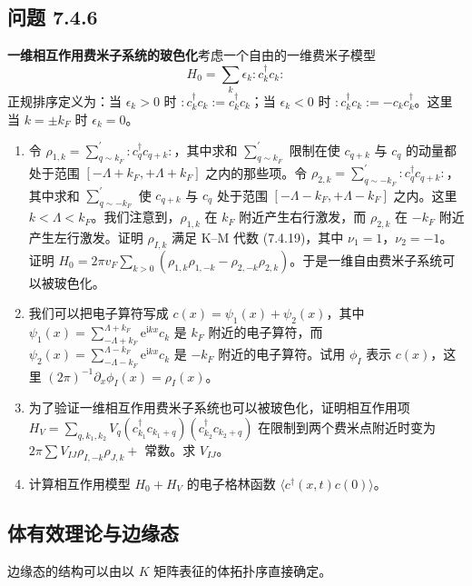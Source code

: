 \subsection*{问题 7.4.6}

\textbf{一维相互作用费米子系统的玻色化}考虑一个自由的一维费米子模型
\begin{equation*}
H_0=\sum_k\epsilon_k:c_k^\dagger c_k:
\end{equation*}
正规排序定义为：当 $\epsilon_k>0$ 时 $:c_k^\dagger c_k:=c_k^\dagger c_k$；当 $\epsilon_k<0$ 时 $:c_k^\dagger c_k:=-c_kc_k^\dagger$。这里当 $k=\pm k_F$ 时 $\epsilon_k=0$。
\begin{enumerate}
\item 令 $\rho_{1,k}=\sum_{q\sim k_F}^{\prime}:c_q^\dagger c_{q+k}:$，其中求和 $\sum_{q\sim k_F}^{\prime}$ 限制在使 $c_{q+k}$ 与 $c_q$ 的动量都处于范围 $[-\Lambda+k_F,+\Lambda+k_F]$ 之内的那些项。令 $\rho_{2,k}=\sum_{q\sim-k_F}^{\prime}:c_q^\dagger c_{q+k}:$，其中求和 $\sum_{q\sim-k_F}^{\prime}$ 使 $c_{q+k}$ 与 $c_q$ 处于范围 $[-\Lambda-k_F,+\Lambda-k_F]$ 之内。这里 $k<\Lambda<k_F$。我们注意到，$\rho_{1,k}$ 在 $k_F$ 附近产生右行激发，而 $\rho_{2,k}$ 在 $-k_F$ 附近产生左行激发。证明 $\rho_{I,k}$ 满足 K--M 代数 (7.4.19)，其中 $\nu_1=1$，$\nu_2=-1$。证明 $H_0=2\pi v_F\sum_{k>0}(\rho_{1,k}\rho_{1,-k}-\rho_{2,-k}\rho_{2,k})$。于是一维自由费米子系统可以被玻色化。
\item 我们可以把电子算符写成 $c(x)=\psi_1(x)+\psi_2(x)$，其中 $\psi_1(x)=\sum_{-\Lambda+k_F}^{\Lambda+k_F}\mathrm{e}^{\mathrm{i}kx}c_k$ 是 $k_F$ 附近的电子算符，而 $\psi_2(x)=\sum_{-\Lambda-k_F}^{\Lambda-k_F}\mathrm{e}^{\mathrm{i}kx}c_k$ 是 $-k_F$ 附近的电子算符。试用 $\phi_I$ 表示 $c(x)$，这里 $(2\pi)^{-1}\partial_x\phi_I(x)=\rho_I(x)$。
\item 为了验证一维相互作用费米子系统也可以被玻色化，证明相互作用项 $H_V=\sum_{q,k_1,k_2}V_q\allowbreak(c_{k_1}^\dagger c_{k_1+q})\allowbreak(c_{k_2}^\dagger c_{k_2+q})$ 在限制到两个费米点附近时变为 $2\pi\sum\allowbreak V_{IJ}\rho_{I,-k}\rho_{J,k}+$ 常数。求 $V_{IJ}$。
\item 计算相互作用模型 $H_0+H_V$ 的电子格林函数 $\langle c^\dagger(x,t)c(0)\rangle$。
\end{enumerate}

\subsection{体有效理论与边缘态}

\begin{keypoints}
\item 边缘态的结构可以由以 $K$ 矩阵表征的体拓扑序直接确定。
\end{keypoints}

